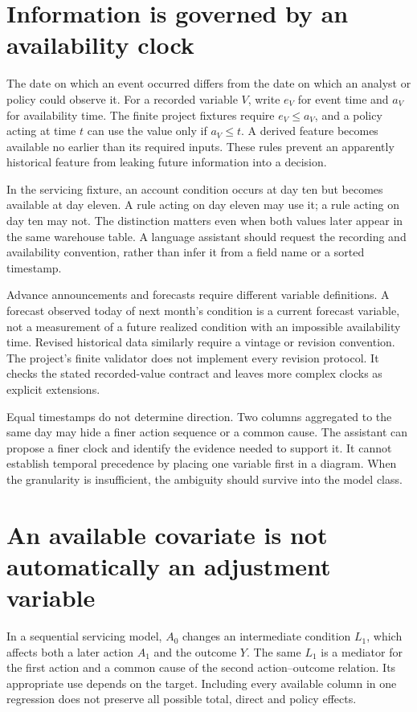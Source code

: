 \section{Information is governed by an availability clock}

The date on which an event occurred differs from the date on which an analyst
or policy could observe it. For a recorded variable \(V\), write \(e_V\) for
event time and \(a_V\) for availability time. The finite project fixtures
require \(e_V\leq a_V\), and a policy acting at time \(t\) can use the value
only if \(a_V\leq t\). A derived feature becomes available no earlier than
its required inputs. These rules prevent an apparently historical feature
from leaking future information into a decision.

In the servicing fixture, an account condition occurs at day ten but becomes
available at day eleven. A rule acting on day eleven may use it; a rule acting
on day ten may not. The distinction matters even when both values later appear
in the same warehouse table. A language assistant should request the recording
and availability convention, rather than infer it from a field name or a
sorted timestamp.

Advance announcements and forecasts require different variable definitions.
A forecast observed today of next month's condition is a current forecast
variable, not a measurement of a future realized condition with an impossible
availability time. Revised historical data similarly require a vintage or
revision convention. The project's finite validator does not implement every
revision protocol. It checks the stated recorded-value contract and leaves
more complex clocks as explicit extensions.

Equal timestamps do not determine direction. Two columns aggregated to the
same day may hide a finer action sequence or a common cause. The assistant
can propose a finer clock and identify the evidence needed to support it.
It cannot establish temporal precedence by placing one variable first in a
diagram. When the granularity is insufficient, the ambiguity should survive
into the model class.

\section{An available covariate is not automatically an adjustment variable}

In a sequential servicing model, \(A_0\) changes an intermediate condition
\(L_1\), which affects both a later action \(A_1\) and the outcome \(Y\).
The same \(L_1\) is a mediator for the first action and a common cause of the
second action--outcome relation. Its appropriate use depends on the target.
Including every available column in one regression does not preserve all
possible total, direct and policy effects.

